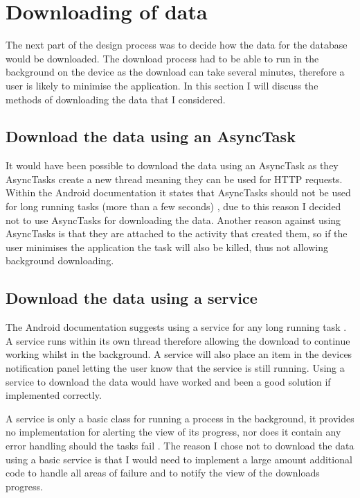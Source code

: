 \section{Downloading of data}

The next part of the design process was to decide how the data for the database would be downloaded. The download process had to be able to run in the background on the device as the download can take several minutes, therefore a user is likely to minimise the application. In this section I will discuss the methods of downloading the data that I considered.

\subsection{Download the data using an AsyncTask}

It would have been possible to download the data using an AsyncTask \cite{async_task} as they AsyncTasks create a new thread meaning they can be used for HTTP requests. Within the Android documentation it states that AsyncTasks should not be used for long running tasks (more than a few seconds) \cite{async_task}, due to this reason I decided not to use AsyncTasks for downloading the data. Another reason against using AsyncTasks is that they are attached to the activity that created them, so if the user minimises the application the task will also be killed, thus not allowing background downloading.

\subsection{Download the data using a service}

The Android documentation suggests using a service \cite{service} for any long running task \cite{async_task}. A service runs within its own thread therefore allowing the download to continue working whilst in the background.  A service will also place an item in the devices notification panel letting the user know that the service is still running. Using a service to download the data would have worked and been a good solution if implemented correctly.

A service is only a basic class for running a process in the background, it provides no implementation for alerting the view of its progress, nor does it contain any error handling should the tasks fail \cite{service}. The reason I chose not to download the data using a basic service is that I would need to implement a large amount additional code to handle all areas of failure and to notify the view of the downloads progress.


